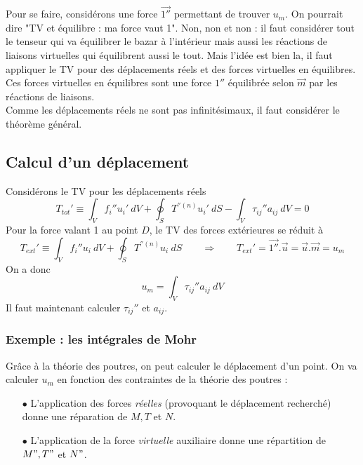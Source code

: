 		Pour se faire, considérons une force $\vec{1''}$ permettant de 
		trouver $u_m$. On pourrait dire "TV et équilibre : ma force vaut 
		1". Non, non et non : il faut considérer tout le tenseur qui va 
		équilibrer le bazar à l'intérieur mais aussi les réactions de 
		liaisons virtuelles qui équilibrent aussi le tout.
		Mais l'idée est bien la, il faut appliquer le TV pour des 
		déplacements réels et des forces virtuelles en équilibres. Ces 
		forces virtuelles en équilibres sont une force $1''$ équilibrée 
		selon $\vec{m}$ par les réactions de liaisons.\\
		Comme les déplacements réels ne sont pas infinitésimaux, il faut 
		considérer le théorème général.
		
		
	\subsection{Calcul d'un déplacement}
	Considérons le TV pour les déplacements réels
	\begin{equation}
	T_{tot}' \equiv \int_V f_i''u_i'\ dV + \oint_S T^{''(n)}u_i'\ dS - 
	\int_V \tau_{ij}''a_{ij}\ dV = 0
	\end{equation}
	Pour la force valant 1 au point $D$, le TV des forces extérieures se 
	réduit à 
	\begin{equation}
	T_{ext}' \equiv \int_V f_i''u_i\ dV + \oint_S T^{''(n)}u_i\ dS\qquad
	\Longrightarrow\qquad T_{ext}' = \vec{1''}.\vec{u} = \vec{u}.\vec{m}=u_m
	\end{equation}
	On a donc
	\begin{equation}
	u_m = \int_V \tau_{ij}''a_{ij}\ dV
	\end{equation}
	Il faut maintenant calculer $\tau_{ij}''$ et $a_{ij}$.
	
		\subsubsection{Exemple : les intégrales de Mohr}
		Grâce à la théorie des poutres, on peut calculer le déplacement 
		d'un point. On va calculer $u_m$ en fonction des contraintes de 
		la théorie des poutres :
		\begin{itemize}
		\item[$\bullet$] L'application des forces \textit{réelles} 
		(provoquant le déplacement recherché) donne une réparation de $M, 
		T$ et $N$.
		\item[$\bullet$] L’application de la force \textit{virtuelle} 
		auxiliaire donne une répartition de $M", T"$ et $N"$.
		\end{itemize}
		
